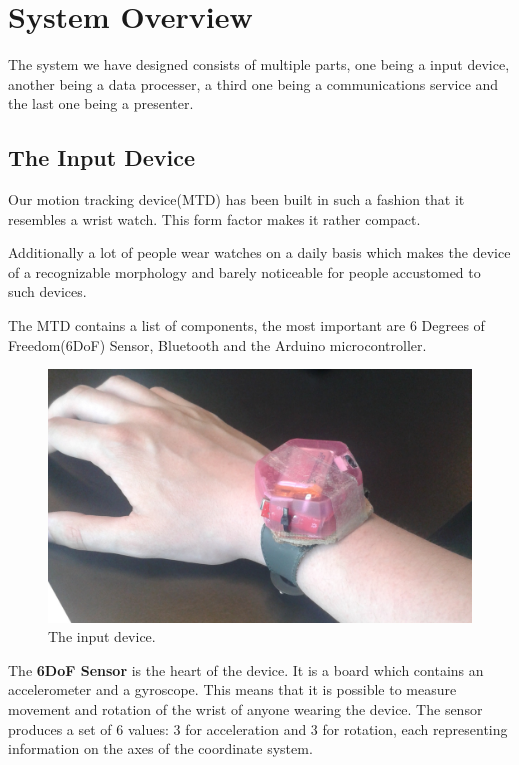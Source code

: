 \section{System Overview}
The system we have designed consists of multiple parts,
one being a input device, another being a data processer, 
a third one being a communications service and the last one being a presenter.

\subsection{The Input Device}
Our motion tracking device(MTD) has been built in such a fashion that it resembles a wrist watch.
This form factor makes it rather compact.

Additionally a lot of people wear watches on a daily basis which makes the device of a recognizable morphology and barely noticeable for people accustomed to such devices.

The MTD contains a list of components, the most important are 6 Degrees of Freedom(6DoF) Sensor, Bluetooth and the Arduino microcontroller.

\begin{figure}[!h]
\centering
\includegraphics[width=1\columnwidth]{img/watch}
\caption{The input device.}
\label{fig:figure5}
\end{figure}

The \textbf{6DoF Sensor} is the heart of the device.
It is a board which contains an accelerometer and a gyroscope.
This means that it is possible to measure movement and rotation of the wrist of anyone wearing the device.
The sensor produces a set of 6 values: 3 for acceleration and 3 for rotation, each representing information on the axes of the coordinate system.

